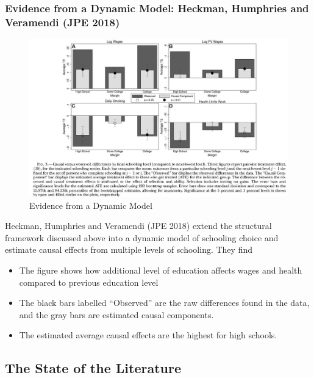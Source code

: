         \subsubsection{Evidence from a Dynamic Model: Heckman, Humphries and Veramendi (JPE 2018)}

            \begin{figure}[H]%
                \centering
                \includegraphics[width=5in]{images/ch3/48.png}
                \caption {Evidence from a Dynamic Model}
                \end{figure}

            Heckman, Humphries and Veramendi (JPE 2018) extend the structural framework discussed above into a dynamic model of schooling choice and estimate causal effects from multiple levels of schooling. They find 

            \begin{itemize}
                \item The figure shows how additional level of education affects wages and health compared to previous education level
                \item The black bars labelled “Observed” are the raw differences found in the data, and the gray bars are estimated causal components.
                \item The estimated average causal effects are the highest for high schools.
            \end{itemize}
         
    \subsection{The State of the Literature}\label{sec:health_edu_recent}

